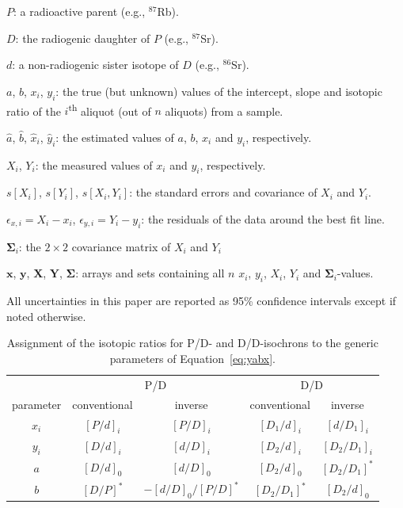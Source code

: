 \documentclass{article}
\begin{document}
\begin{description}
\item{$P$:} a radioactive parent (e.g., ${}^{87}$Rb).
\item{$D$:} the radiogenic daughter of $P$ (e.g., ${}^{87}$Sr).
\item{$d$:} a non-radiogenic sister isotope of $D$ (e.g., ${}^{86}$Sr).
\item{$a$, $b$, $x_i$, $y_i$:} the true (but unknown) values of the
  intercept, slope and isotopic ratio of the $i$\textsuperscript{th}
  aliquot (out of $n$ aliquots) from a sample.
\item{$\hat{a}$, $\hat{b}$, $\hat{x}_i$, $\hat{y}_i$:} the estimated
  values of $a$, $b$, $x_i$ and $y_i$, respectively.
\item{$X_i$, $Y_i$:} the measured values of $x_i$ and $y_i$,
  respectively.
\item{$s[X_i]$, $s[Y_i]$, $s[X_i,Y_i]$:} the standard errors and
  covariance of $X_i$ and $Y_i$.
\item{$\epsilon_{x,i}=X_i-x_i$, $\epsilon_{y,i}=Y_i-y_i$:} the
  residuals of the data around the best fit line.
\item{$\mathbf{\Sigma}_i$:} the ${2}\times{2}$ covariance matrix of $X_i$ and $Y_i$
\item{$\mathbf{x}$, $\mathbf{y}$, $\mathbf{X}$, $\mathbf{Y}$,
  $\mathbf{\Sigma}$:} arrays and sets containing all $n$ $x_i$, $y_i$,
  $X_i$, $Y_i$ and $\mathbf{\Sigma}_i$-values.
\end{description}

All uncertainties in this paper are reported as 95\% confidence
intervals except if noted otherwise.

\begin{table}[!ht]
  \centering
  \caption{Assignment of the isotopic ratios for P/D- and
    D/D-isochrons to the generic parameters of
    Equation~\ref{eq:yabx}.}
  \label{tab:PDDD}
  \begin{tabular}{ccccc}
    ~ & \multicolumn{2}{c}{P/D} & \multicolumn{2}{c}{D/D} \\ \cline{2-5}
    parameter & conventional & inverse & conventional & inverse \\ \hline
    $x_i$ & $[P/d]_i$ & $[P/D]_i$ & $[D_1/d]_i$ & $[d/D_1]_i$ \\
    $y_i$ & $[D/d]_i$ & $[d/D]_i$ & $[D_2/d]_i$ & $[D_2/D_1]_i$ \\
    $a$ & $[D/d]_0$ & $[d/D]_0$ & $[D_2/d]_0$ & $[D_2/D_1]^\ast$ \\
    $b$ & $[D/P]^\ast$ & $-[d/D]_0/[P/D]^\ast$ & $[D_2/D_1]^\ast$ & $[D_2/d]_0$ \\ \hline
  \end{tabular}
\end{table}
\end{document}
